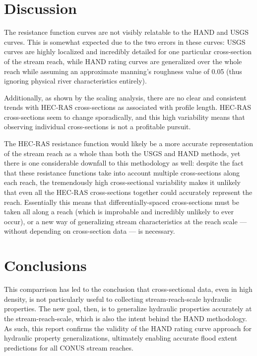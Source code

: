 \documentclass[12pt]{article}
\begin{document}
\section*{Discussion}

The resistance function curves are not visibly relatable to the HAND and USGS curves. This is somewhat expected due to the two errors in these curves: USGS curves are highly localized and incredibly detailed for one particular cross-section of the stream reach, while HAND rating curves are generalized over the whole reach while assuming an approximate manning's roughness value of 0.05 (thus ignoring physical river characteristics entirely). 

Additionally, as shown by the scaling analysis, there are no clear and consistent trends with HEC-RAS cross-sections as associated with profile length. HEC-RAS cross-sections seem to change sporadically, and this high variability means that observing individual cross-sections is not a profitable pursuit. 

The HEC-RAS resistance function would likely be a more accurate representation of the stream reach as a whole than both the USGS and HAND methods, yet there is one considerable downfall to this methodology as well: despite the fact that these resistance functions take into account multiple cross-sections along each reach, the tremendously high cross-sectional variability makes it unlikely that even all the HEC-RAS cross-sections together could accurately represent the reach. Essentially this means that differentially-spaced cross-sections must be taken all along a reach (which is improbable and incredibly unlikely to ever occur), or a new way of generalizing stream characteristics at the reach scale --- without depending on cross-section data --- is necessary. 

\section*{Conclusions}

This comparrison has led to the conclusion that cross-sectional data, even in high density, is not particularly useful to collecting stream-reach-scale hydraulic properties. The new goal, then, is to generalize hydraulic properties accurately at the stream-reach-scale, which is also the intent behind the HAND methodology. As such, this report confirms the validity of the HAND rating curve approach for hydraulic property generalizations, ultimately enabling accurate flood extent predictions for all CONUS stream reaches. 

\printbibliography
\end{document}
